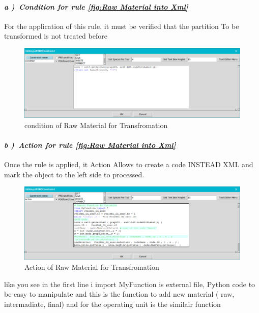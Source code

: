 \paragraph{\emph{ a )~Condition for rule \ref{fig:Raw Material into Xml} } } For the application of this rule, it must be verified that the partition To be transformed is not treated before

\begin{figure}[th]
	\centering  %
 	\includegraphics[scale=0.38]{ch3/img/xcond1}
	\caption{\label{fig:condition of Raw Material for Transfromation}condition of Raw Material for Transfromation}
\end{figure}
\paragraph{\emph{ b )~Action for rule \ref{fig:Raw Material into Xml} } }  Once the rule is applied, it Action Allows to create a code INSTEAD XML and mark the object to the left side to processed.  
 
\begin{figure}[th]
	\centering  %
 	\includegraphics[scale=0.38]{ch3/img/xact1}
	\caption{\label{fig:Action of Raw Material for Transfromation}Action of Raw Material for Transfromation}
\end{figure} 
\vspace{1cm}
like you see in the first line i import MyFunction is external file, Python code 
to be easy to manipulate  and this is the function to add new material ( raw, intermadiate, final)
and for the operating unit is the similair function
 
